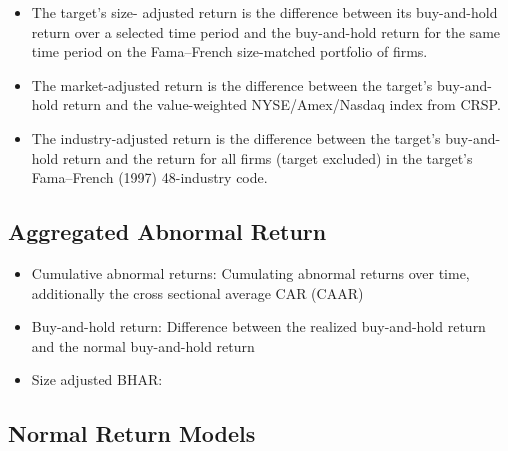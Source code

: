 \documentclass[12pt]{article}
\begin{document}
    \begin{itemize}
        \item The target’s size- adjusted return is the difference between its buy-and-hold return over a selected time period and the buy-and-hold return for the same time period on the Fama–French size-matched portfolio of firms. 
        
        \item The market-adjusted return is the difference between the target’s buy-and-hold return and the value-weighted NYSE/Amex/Nasdaq index from CRSP. 
        
        \item The industry-adjusted return is the difference between the target’s buy-and-hold return and the return for all firms (target excluded) in the target’s Fama–French (1997) 48-industry code. \citep{Klein2009}
    \end{itemize}

\subsection{Aggregated Abnormal Return}

    \begin{itemize}
        \item Cumulative abnormal returns: Cumulating abnormal returns over time, additionally the cross sectional average CAR (CAAR)

        \item Buy-and-hold return: Difference between the realized buy-and-hold return and the normal buy-and-hold return

        \item Size adjusted BHAR: 
    \end{itemize}


\subsection{Normal Return Models}
\end{document}
